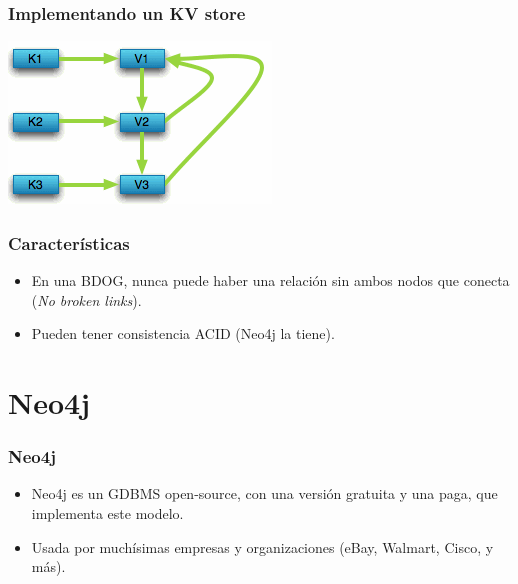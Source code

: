 \begin{frame}
\frametitle{Implementando un KV store}
 \center
 \includegraphics[width=0.9\linewidth,height=0.9\textheight,keepaspectratio]{bdog-4}
\end{frame}

\begin{frame}
\frametitle{Características}
\begin{itemize}
\item	En una BDOG, nunca puede haber una relación sin ambos nodos
	que conecta (\textit{No broken links}).
	\pause

\item	Pueden tener consistencia ACID (Neo4j la tiene).
\end{itemize}
\end{frame}

\section{Neo4j}

\begin{frame}
\frametitle{Neo4j}
\begin{itemize}
\item	Neo4j es un GDBMS open-source, con una versión gratuita y una
	paga, que implementa este modelo.
	\pause

\item	Usada por muchísimas empresas y organizaciones (eBay, Walmart,
	Cisco, y más).
\end{itemize}
\end{frame}
